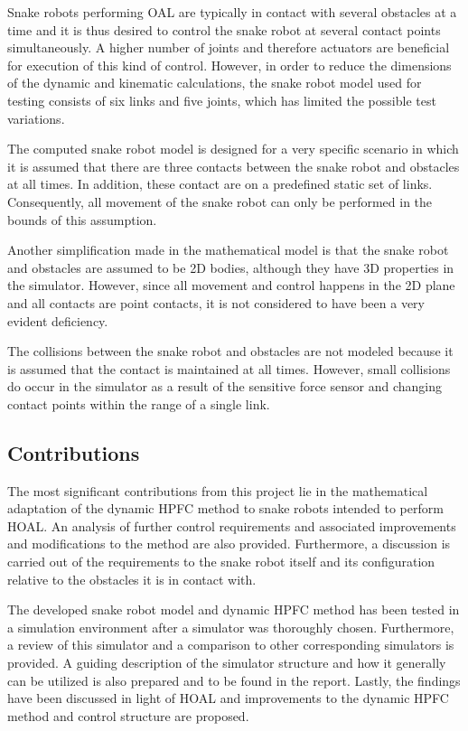 Snake robots performing OAL are typically in contact with several obstacles at a time and it is thus desired to control the snake robot at several contact points simultaneously. A higher number of joints and therefore actuators are beneficial for execution of this kind of control. However, in order to reduce the dimensions of the dynamic and kinematic calculations, the snake robot model used for testing consists of six links and five joints, which has limited the possible test variations.

The computed snake robot model is designed for a very specific scenario in which it is assumed that there are three contacts between the snake robot and obstacles at all times. In addition, these contact are on a predefined static set of links. Consequently, all movement of the snake robot can only be performed in the bounds of this assumption. 

Another simplification made in the mathematical model is that the snake robot and obstacles are assumed to be 2D bodies, although they have 3D properties in the simulator. However, since all movement and control happens in the 2D plane and all contacts are point contacts, it is not considered to have been a very evident deficiency.

The collisions between the snake robot and obstacles are not modeled because it is assumed that the contact is maintained at all times. However, small collisions do occur in the simulator as a result of the sensitive force sensor and changing contact points within the range of a single link.

\subsection{Contributions}

The most significant contributions from this project lie in the mathematical adaptation of the dynamic HPFC method to snake robots intended to perform HOAL. An analysis of further control requirements and associated improvements and modifications to the method are also provided. Furthermore, a discussion is carried out of the requirements to the snake robot itself and its configuration relative to the obstacles it is in contact with.

The developed snake robot model and dynamic HPFC method has been tested in a simulation environment after a simulator was thoroughly chosen. Furthermore, a review of this simulator and a comparison to other corresponding simulators is provided. A guiding description of the simulator structure and how it generally can be utilized is also prepared and to be found in the report. Lastly, the findings have been discussed in light of HOAL and improvements to the dynamic HPFC method and control structure are proposed.



